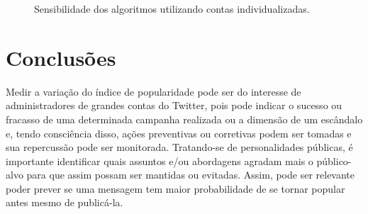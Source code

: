 \documentclass[oneside,openright,12pt]{ufsm_2015} %
\begin{document}
    \begin{figure}[!ht]
    \caption{Sensibilidade dos algoritmos utilizando contas individualizadas.}
    \centering
    \label{tik:sensibilidade-individual}
    \end{figure}


\chapter{Conclusões}
\label{sec:conclusao}

    \par Medir a variação do índice de popularidade pode ser do interesse de administradores de grandes contas do Twitter, pois pode indicar o sucesso ou fracasso de uma determinada campanha realizada ou a dimensão de um escândalo e, tendo consciência disso, ações preventivas ou corretivas podem ser tomadas e sua repercussão pode ser monitorada. Tratando-se de personalidades públicas, é importante identificar quais assuntos e/ou abordagens agradam mais o público-alvo para que assim possam ser mantidas ou evitadas. Assim, pode ser relevante poder prever se uma mensagem tem maior probabilidade de se tornar popular antes mesmo de publicá-la. 
\end{document}
